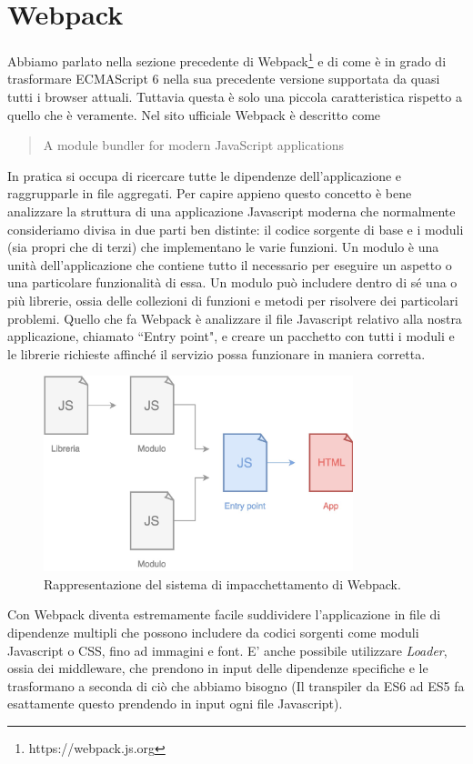 \section{Webpack}
Abbiamo parlato nella sezione precedente di Webpack\footnote{https://webpack.js.org} e di come è in grado di trasformare ECMAScript 6 nella sua precedente versione supportata da quasi tutti i browser attuali. Tuttavia questa è solo una piccola caratteristica rispetto a quello che è veramente.
Nel sito ufficiale Webpack è descritto come \blockquote{A module bundler for modern JavaScript applications}. In pratica si occupa di ricercare tutte le dipendenze dell'applicazione e raggrupparle in file aggregati. 
Per capire appieno questo concetto è bene analizzare la struttura di una applicazione Javascript moderna che normalmente consideriamo divisa in due parti ben distinte: il codice sorgente di base e i moduli (sia propri che di terzi) che implementano le varie funzioni. Un modulo è una unità dell'applicazione che contiene tutto il necessario per eseguire un aspetto o una particolare funzionalità di essa. Un modulo può includere dentro di sé una o più librerie, ossia delle collezioni di funzioni e metodi per risolvere dei particolari problemi. Quello che fa Webpack è analizzare il file Javascript relativo alla nostra applicazione, chiamato “Entry point", e creare un pacchetto con tutti i moduli e le librerie richieste affinché il servizio possa funzionare in maniera corretta. 

\begin{figure}[h]
\centering
\includegraphics[width=9cm]{./images/webpackWorkflow}
\caption{Rappresentazione del sistema di impacchettamento di Webpack.}
\end{figure}

\noindent
Con Webpack diventa estremamente facile suddividere l'applicazione in file di dipendenze multipli che possono includere da codici sorgenti come moduli Javascript o CSS, fino ad immagini e font.
E' anche possibile utilizzare \textit{Loader}, ossia dei middleware, che prendono in input delle dipendenze specifiche e le trasformano a seconda di ciò che abbiamo bisogno (Il transpiler da ES6 ad ES5 fa esattamente questo prendendo in input ogni file Javascript).

